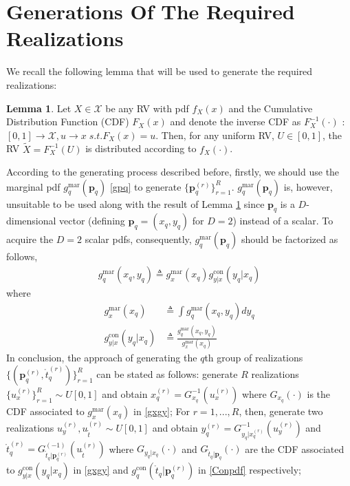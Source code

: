 \documentclass[review]{elsarticle}
\begin{document}
\section{Generations Of The Required Realizations}
We recall the following lemma \cite{Kay2006Intuitive} that will be used to generate the required realizations:
\theoremstyle{definition} \newtheorem{Lemma}{Lemma}
\begin{Lemma}\label{Lemma1}
    Let $X \in \mathcal{X}$ be any RV with pdf $f_X(x)$ and the Cumulative Distribution Function (CDF) $F_X(x)$ and denote the inverse CDF as $F_X^{-1}(\cdot)$ : $[0,1]\to \mathcal{X},  u\to x \; s.t. F_X(x)=u$. Then, for any uniform RV, $U\in [0,1]$, the RV $\tilde{X}=F_X^{-1}(U)$ is distributed according to $f_X(\cdot)$.
\end{Lemma}
According to the generating process described before, firstly, we should use the marginal pdf $g_{q}^{\text{mar}}(\boldsymbol{p}_q)$ \eqref{gpq} to generate $\lbrace \boldsymbol{p}_q^{(r)}\rbrace_{r=1}^R$. $g_{q}^{\text{mar}}(\boldsymbol{p}_q)$ is, however, unsuitable to be used along with the result of Lemma \ref{Lemma1} since $\boldsymbol{p}_q$ is a $D$-dimensional vector (defining $\boldsymbol{p}_q=(x_q,y_q)$ for $D=2$) instead of a scalar. To acquire the $D=2$ scalar pdfs, consequently, $g_{q}^{\text{mar}}(\boldsymbol{p}_q)$ should be factorized as follows,
\begin{align}
    g_{q}^{\text{mar}}(x_q,y_q)\triangleq g_{x}^{\text{mar}}(x_q)g_{y\vert x}^{\text{con}}(y_q\vert x_q)
\end{align}
where 
\begin{align}\label{gxgy}
    g_{x}^{\text{mar}}(x_q)&\triangleq \int g_{q}^{\text{mar}}(x_q,y_q) dy_q\\
    g_{y\vert x}^{\text{con}}(y_q\vert x_q)&\triangleq \frac{g_{q}^{\text{mar}}(x_q,y_q)}{g_{x}^{\text{mar}}(x_q)}
\end{align}
In conclusion, the approach of generating the $q$th group of realizations $\lbrace(\boldsymbol{p}_q^{(r)},\mathring{t}_q^{(r)})\rbrace_{r=1}^{R}$ can be stated as follows: generate $R$ realizations $\lbrace u_x^{(r)}\rbrace_{r=1}^R\sim U[0,1]$ and obtain $x_q^{(r)}=G_{x_q}^{-1}(u_x^{(r)})$ where $G_{x_q}(\cdot)$ is the CDF associated to $g_{x}^{\text{mar}}(x_q)$ in \eqref{gxgy}; For $r=1,...,R$, then, generate two realizations $u_y^{(r)},u_{\mathring{t}}^{(r)}\sim U[0,1]$ and obtain $y_q^{(r)}=G_{y_q\vert x_q^{(r)}}^{-1}(u_y^{(r)})$ and $\mathring{t}_q^{(r)}=G^{(-1)}_{\mathring{t}_q\vert \boldsymbol{p}_q^{(r)}}(u_{\mathring{t}}^{(r)})$ where $G_{y_q\vert x_q}(\cdot)$ and $G_{\mathring{t}_q\vert \boldsymbol{p}_q}(\cdot)$ are the CDF associated to $g_{y\vert x}^{\text{con}}(y_q\vert x_q)$ in \eqref{gxgy} and $g_{q}^{\text{con}}(\mathring{t}_q\vert \boldsymbol{p}_q^{(r)})$ in \eqref{Conpdf} respectively; 
\end{document}
